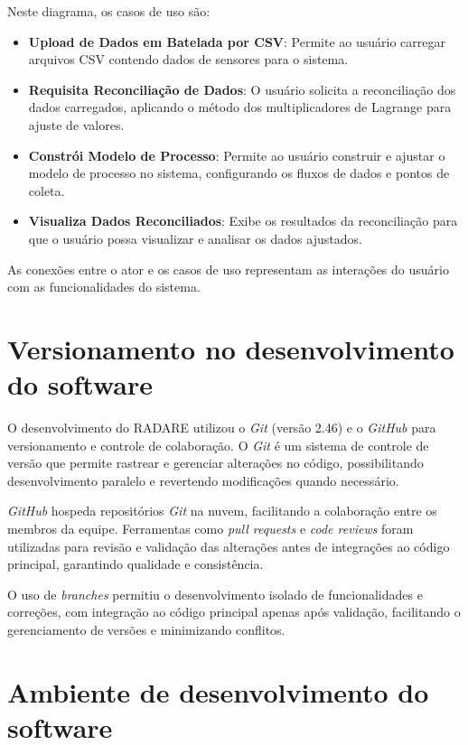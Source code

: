 Neste diagrama, os casos de uso são:

\begin{itemize}
    \item \textbf{Upload de Dados em Batelada por CSV}: Permite ao usuário carregar arquivos CSV contendo dados de sensores para o sistema.
    \item \textbf{Requisita Reconciliação de Dados}: O usuário solicita a reconciliação dos dados carregados, aplicando o método dos multiplicadores de Lagrange para ajuste de valores.
    \item \textbf{Constrói Modelo de Processo}: Permite ao usuário construir e ajustar o modelo de processo no sistema, configurando os fluxos de dados e pontos de coleta.
    \item \textbf{Visualiza Dados Reconciliados}: Exibe os resultados da reconciliação para que o usuário possa visualizar e analisar os dados ajustados.
\end{itemize}

As conexões entre o ator e os casos de uso representam as interações do usuário com as funcionalidades do sistema.

\section{Versionamento no desenvolvimento do software}

O desenvolvimento do RADARE utilizou o \textit{Git} (versão 2.46) e o \textit{GitHub} para versionamento e controle de colaboração. O \textit{Git} é um sistema de controle de versão que permite rastrear e gerenciar alterações no código, possibilitando desenvolvimento paralelo e revertendo modificações quando necessário.

\textit{GitHub} hospeda repositórios \textit{Git} na nuvem, facilitando a colaboração entre os membros da equipe. Ferramentas como \textit{pull requests} e \textit{code reviews} foram utilizadas para revisão e validação das alterações antes de integrações ao código principal, garantindo qualidade e consistência.

O uso de \textit{branches} permitiu o desenvolvimento isolado de funcionalidades e correções, com integração ao código principal apenas após validação, facilitando o gerenciamento de versões e minimizando conflitos.


\section{Ambiente de desenvolvimento do software}

